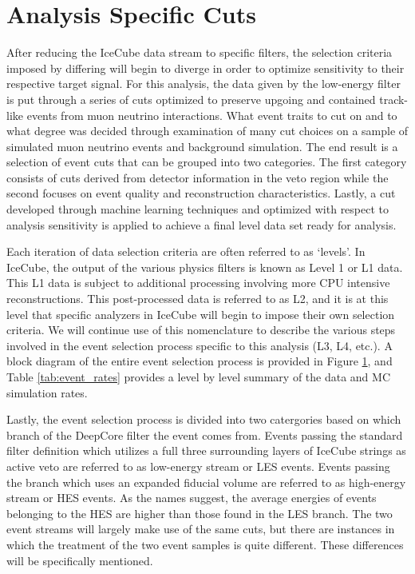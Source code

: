 \documentclass{gatech-thesis}
\begin{document}
\section{Analysis Specific Cuts}
After reducing the IceCube data stream to specific filters, the selection criteria imposed by differing will begin to diverge in order to optimize sensitivity to their respective target signal. For this analysis, the data given by the low-energy filter is put through a series of cuts optimized to preserve upgoing and contained track-like events from muon neutrino interactions. What event traits to cut on and to what degree was decided through examination of many cut choices on a sample of simulated muon neutrino events and background simulation. The end result is a selection of event cuts that can be grouped into two categories. The first category consists of cuts derived from detector information in the veto region while the second focuses on event quality and reconstruction characteristics. Lastly, a cut developed through machine learning techniques and optimized with respect to analysis sensitivity is applied to achieve a final level data set ready for analysis.

Each iteration of data selection criteria are often referred to as `levels'. In IceCube, the output of the various physics filters is known as Level 1 or L1 data. This L1 data is subject to additional processing involving more CPU intensive reconstructions. This post-processed data is referred to as L2, and it is at this level that specific analyzers in IceCube will begin to impose their own selection criteria. We will continue use of this nomenclature to describe the various steps involved in the event selection process specific to this analysis (L3, L4, etc.). A block diagram of the entire event selection process is provided in Figure \ref{}, and Table \ref{tab:event_rates} provides a level by level summary of the data and MC simulation rates.

Lastly, the event selection process is divided into two catergories based on which branch of the DeepCore filter the event comes from. Events passing the standard filter definition which utilizes a full three surrounding layers of IceCube strings as active veto are referred to as low-energy stream or LES events. Events passing the branch which uses an expanded fiducial volume are referred to as high-energy stream or HES events. As the names suggest, the average energies of events belonging to the HES are higher than those found in the LES branch. The two event streams will largely make use of the same cuts, but there are instances in which the treatment of the two event samples is quite different. These differences will be specifically mentioned.
\end{document}
